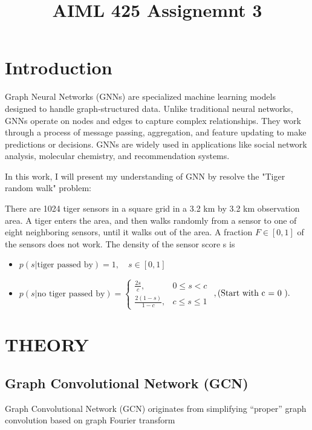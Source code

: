 \documentclass{article}
\title{AIML 425 Assignemnt 3}
\begin{document}
%
\maketitle
%
\section{Introduction}
\label{sec:intro}

Graph Neural Networks (GNNs) are specialized machine learning models designed to handle graph-structured data. Unlike traditional neural networks, GNNs operate on nodes and edges to capture complex relationships. They work through a process of message passing, aggregation, and feature updating to make predictions or decisions. GNNs are widely used in applications like social network analysis, molecular chemistry, and recommendation systems.

In this work, I will present my understanding of GNN by resolve the "Tiger random walk" problem:

There are 1024 tiger sensors in a square grid in a 3.2 km
by 3.2 km observation area. A tiger enters the area, and then
walks randomly from a sensor to one of eight neighboring
sensors, until it walks out of the area. A fraction $F \in [0, 1]$ of
the sensors does not work. The density of the sensor score s is

\begin{itemize}
  \item $p(s | \text{tiger passed by}) = 1, \quad s \in [0, 1]$
  \item $p(s | \text{no tiger passed by}) = \begin{cases} \frac{2s}{c}, & 0 \leq s < c \\\frac{2(1 - s)}{1 - c}, & c \leq s \leq 1 \end{cases}$
  $\\,\text{(Start with  c = 0 ).}$
\end{itemize}



\section{THEORY}
\label{sec:theory}

\subsection{Graph Convolutional Network (GCN)}
\label{ssec:gcn}
Graph Convolutional Network (GCN) \cite{kipf2016semi} originates from simplifying “proper” graph convolution based on graph Fourier transform
 
\end{document}

